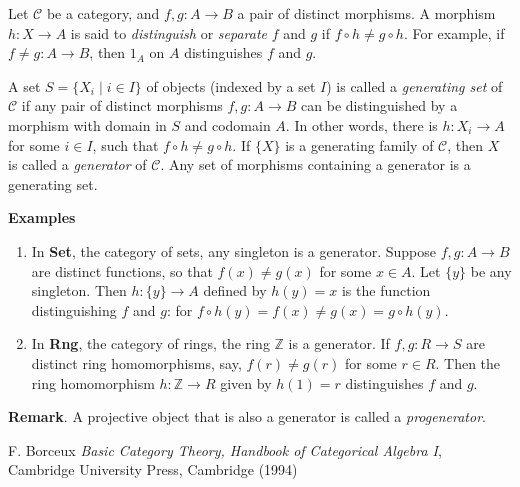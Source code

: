 \documentclass[12pt]{article}
\begin{document}
Let $\mathcal{C}$ be a category, and $f,g:A\to B$ a pair of distinct morphisms.  A morphism $h:X\to A$ is said to \emph{distinguish} or \emph{separate} $f$ and $g$ if $f\circ h\ne g\circ h$.  For example, if $f\ne g:A\to B$, then $1_A$ on $A$ distinguishes $f$ and $g$.

A set $S=\lbrace X_i\mid i\in I\rbrace$ of objects (indexed by a set $I$) is called a \emph{generating set} of $\mathcal{C}$ if any pair of distinct morphisms $f,g:A\to B$ can be distinguished by a morphism with domain in $S$ and codomain $A$.  In other words, there is $h:X_i\to A$ for some $i\in I$, such that $f\circ h\ne g\circ h$.  If $\lbrace X\rbrace$ is a generating family of $\mathcal{C}$, then $X$ is called a \emph{generator} of $\mathcal{C}$.  Any set of morphisms containing a generator is a generating set.

\textbf{Examples}
\begin{enumerate}
\item
In \textbf{Set}, the category of sets, any singleton is a generator.  Suppose $f,g:A\to B$ are distinct functions, so that $f(x)\ne g(x)$ for some $x\in A$.  Let $\lbrace y\rbrace$ be any singleton.  Then $h:\lbrace y\rbrace \to A$ defined by $h(y)=x$ is the function distinguishing $f$ and $g$: for $f\circ h(y)=f(x)\ne g(x)=g\circ h(y)$.
\item
In \textbf{Rng}, the category of rings, the ring $\mathbb{Z}$ is a generator.  If $f,g:R\to S$ are distinct ring homomorphisms, say, $f(r)\ne g(r)$ for some $r\in R$.  Then the ring homomorphism $h:\mathbb{Z}\to R$ given by $h(1)=r$ distinguishes $f$ and $g$.
\end{enumerate}

\textbf{Remark}.  A projective object that is also a generator is called a \emph{progenerator}.


\begin{thebibliography}{9}
 F. Borceux \emph{Basic Category Theory, Handbook of Categorical Algebra I}, Cambridge University Press, Cambridge (1994)
\end{thebibliography}
\end{document}
